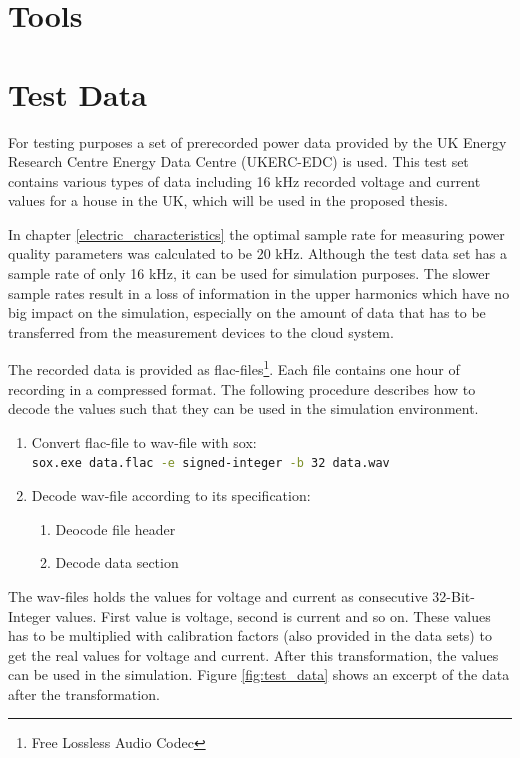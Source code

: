 \section{Tools}

\section{Test Data}
For testing purposes a set of prerecorded power data provided by the UK Energy Research Centre Energy Data Centre (UKERC-EDC) is used\cite{ukerc}.
This test set contains various types of data including 16 kHz recorded voltage and current values for a house in the UK, which will be used in the proposed thesis.

In chapter \ref{electric_characteristics} the optimal sample rate for measuring power quality parameters was calculated to be 20 kHz. Although the test data set has a sample rate of only 16 kHz, it can be used for simulation purposes. The slower sample rates result in a loss of information in the upper harmonics which have no big impact on the simulation, especially on the amount of data that has to be transferred from the measurement devices to the cloud system.

The recorded data is provided as flac-files\footnote{Free Lossless Audio Codec\cite{flac}}. Each file contains one hour of recording in a compressed format. The following procedure describes how to decode the values such that they can be used in the simulation environment.

\begin{enumerate}
	\item Convert flac-file to wav-file with sox\cite{sox}: \\ \lstinline[language=bash,basicstyle=\ttfamily]{sox.exe data.flac -e signed-integer -b 32 data.wav}
	\item Decode wav-file according to its specification\cite{wav}:
	\begin{enumerate}
		\item Deocode file header
		\item Decode data section
	\end{enumerate}
\end{enumerate}

The wav-files holds the values for voltage and current as consecutive 32-Bit-Integer values. First value is voltage, second is current and so on. These values has to be multiplied with calibration factors (also provided in the data sets) to get the real values for voltage and current. After this transformation, the values can be used in the simulation. Figure \ref{fig:test_data} shows an excerpt of the data after the transformation.

